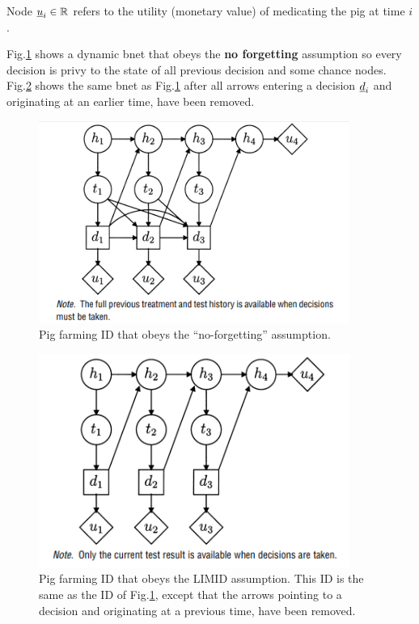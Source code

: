 \begin{itemize}
Node ${\underline{u}}_i\in { \mathbb{R}}$ refers to the utility (monetary value)  
of medicating the pig at time $i$.

 
Fig.\ref{fig-pre-limid} shows a dynamic bnet that
obeys the {\bf no forgetting} assumption so every decision is
privy to the state of all previous decision and some chance nodes.
Fig.\ref{fig-post-limid} shows the same bnet as 
Fig.\ref{fig-pre-limid} after all arrows entering a decision ${\underline{d}}_i$ and originating at an earlier time, have been removed.



\begin{figure}[h!]
\centering
\includegraphics[width=4in]
{influ-diag/pre-limid.jpg}
\caption{Pig farming ID that obeys the \enquote{no-forgetting}
assumption.  
}
\label{fig-pre-limid}
\end{figure}


\begin{figure}[h!]
\centering
\includegraphics[width=4in]
{influ-diag/post-limid.jpg}
\caption{Pig farming ID that obeys the  LIMID
assumption. This ID is the same as the ID of Fig.\ref{fig-pre-limid},
except that the arrows pointing to a decision and originating at a previous time, have been removed.}
\label{fig-post-limid}
\end{figure}


\end{itemize}

